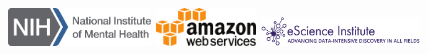 \documentclass[a0paper,landscape,fontscale=0.365]{baposter}
\begin{document}
\begin{poster}
{\begin{multicols}{2}
\smaller %
\includegraphics[height=1.0cm]{logos/nimh-logo.png}
\includegraphics[height=1.0cm]{logos/awslogo}
\includegraphics[height=0.75cm]{logos/eSciencelogo.png}

\end{multicols}
}

\end{poster}
\end{document}
